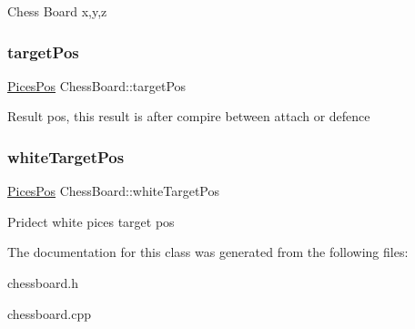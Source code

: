 Chess Board x,y,z \mbox{\label{class_chess_board_af130ebe77300106c1a79a8fd54600cd2}} 
\subsubsection{\texorpdfstring{target\+Pos}{targetPos}}
{\footnotesize\ttfamily \hyperlink{struct_pices_pos}{Pices\+Pos} Chess\+Board\+::target\+Pos}

Result pos, this result is after compire between attach or defence \mbox{\label{class_chess_board_aa03bcc987457e608a908809663085302}} 
\subsubsection{\texorpdfstring{white\+Target\+Pos}{whiteTargetPos}}
{\footnotesize\ttfamily \hyperlink{struct_pices_pos}{Pices\+Pos} Chess\+Board\+::white\+Target\+Pos}

Pridect white pices target pos 

The documentation for this class was generated from the following files\+:\begin{DoxyCompactItemize}
\item 
chessboard.\+h\item 
chessboard.\+cpp\end{DoxyCompactItemize}
